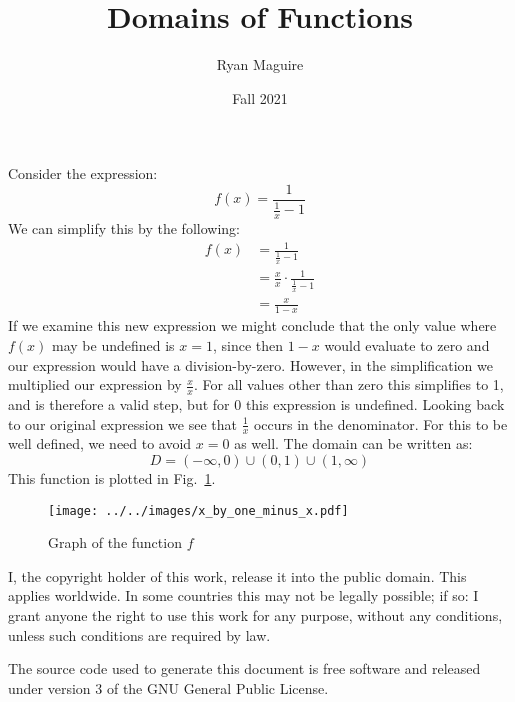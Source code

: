 \documentclass{article}
\title{Domains of Functions}
\author{Ryan Maguire}
\date{Fall 2021}
\begin{document}
    \maketitle
    Consider the expression:
    \begin{equation}
        f(x)=\frac{1}{\frac{1}{x}-1}
    \end{equation}
    We can simplify this by the following:
    \begin{align}
        f(x)&=\frac{1}{\frac{1}{x}-1}\\
            &=\frac{x}{x}\cdot\frac{1}{\frac{1}{x}-1}\\
            &=\frac{x}{1-x}
    \end{align}
    If we examine this new expression we might conclude that the only value
    where $f(x)$ may be undefined is $x=1$, since then $1-x$ would evaluate to
    zero and our expression would have a division-by-zero. However, in the
    simplification we multiplied our expression by $\frac{x}{x}$. For all
    values other than zero this simplifies to 1, and is therefore a valid
    step, but for 0 this expression is undefined. Looking back to our original
    expression we see that $\frac{1}{x}$ occurs in the denominator. For this
    to be well defined, we need to avoid $x=0$ as well. The domain can be
    written as:
    \begin{equation}
        D=(-\infty, 0)\cup(0,1)\cup(1,\infty)
    \end{equation}
    This function is plotted in Fig.~\ref{fig:graph_of_func}.
    \begin{figure}
        \centering
        \texttt{[image: ../../images/x\_by\_one\_minus\_x.pdf]}
        \caption{Graph of the function $f$}
        \label{fig:graph_of_func}
    \end{figure}
    \newpage
    I, the copyright holder of this work, release it into the public domain.
    This applies worldwide. In some countries this may not be legally possible;
    if so: I grant anyone the right to use this work for any purpose, without
    any conditions, unless such conditions are required by law.
    \par\hfill\par
    The source code used to generate this document is free software and released
    under version 3 of the GNU General Public License.
\end{document}
